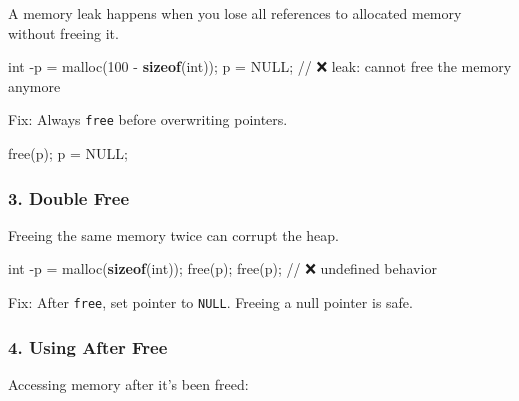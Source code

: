 \documentclass[
  letterpaper,
  DIV=11,
  numbers=noendperiod]{scrreprt}
\newenvironment{Shaded}{\begin{snugshade}}{\end{snugshade}}
\newcommand{\CommentTok}[1]{\textcolor[rgb]{0.37,0.37,0.37}{#1}}
\newcommand{\DataTypeTok}[1]{\textcolor[rgb]{0.68,0.00,0.00}{#1}}
\newcommand{\DecValTok}[1]{\textcolor[rgb]{0.68,0.00,0.00}{#1}}
\newcommand{\KeywordTok}[1]{\textcolor[rgb]{0.00,0.23,0.31}{\textbf{#1}}}
\newcommand{\NormalTok}[1]{\textcolor[rgb]{0.00,0.23,0.31}{#1}}
\newcommand{\OperatorTok}[1]{\textcolor[rgb]{0.37,0.37,0.37}{#1}}
\begin{document}
A memory leak happens when you lose all references to allocated memory
without freeing it.

\begin{Shaded}
\begin{Highlighting}[]
\DataTypeTok{int} \OperatorTok{{-}}\NormalTok{p }\OperatorTok{=}\NormalTok{ malloc}\OperatorTok{(}\DecValTok{100} \OperatorTok{{-}} \KeywordTok{sizeof}\OperatorTok{(}\DataTypeTok{int}\OperatorTok{));}
\NormalTok{p }\OperatorTok{=}\NormalTok{ NULL}\OperatorTok{;}  \CommentTok{// ❌ leak: cannot free the memory anymore}
\end{Highlighting}
\end{Shaded}

Fix: Always \texttt{free} before overwriting pointers.

\begin{Shaded}
\begin{Highlighting}[]
\NormalTok{free}\OperatorTok{(}\NormalTok{p}\OperatorTok{);}
\NormalTok{p }\OperatorTok{=}\NormalTok{ NULL}\OperatorTok{;}
\end{Highlighting}
\end{Shaded}

\subsubsection{3. Double Free}\label{double-free-1}

Freeing the same memory twice can corrupt the heap.

\begin{Shaded}
\begin{Highlighting}[]
\DataTypeTok{int} \OperatorTok{{-}}\NormalTok{p }\OperatorTok{=}\NormalTok{ malloc}\OperatorTok{(}\KeywordTok{sizeof}\OperatorTok{(}\DataTypeTok{int}\OperatorTok{));}
\NormalTok{free}\OperatorTok{(}\NormalTok{p}\OperatorTok{);}
\NormalTok{free}\OperatorTok{(}\NormalTok{p}\OperatorTok{);}   \CommentTok{// ❌ undefined behavior}
\end{Highlighting}
\end{Shaded}

Fix: After \texttt{free}, set pointer to \texttt{NULL}. Freeing a null
pointer is safe.

\subsubsection{4. Using After Free}\label{using-after-free}

Accessing memory after it's been freed:
\end{document}
